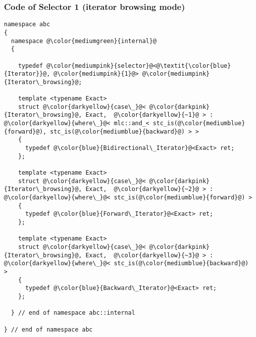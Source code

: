 \begin{frame}[fragile]
  \frametitle{Code of Selector 1 (iterator browsing mode)}

\begin{lstlisting}[escapechar=@,basicstyle={\tiny\sffamily}]
namespace abc
{
  namespace @\color{mediumgreen}{internal}@
  {

    typedef @\color{mediumpink}{selector}@<@\textit{\color{blue}{Iterator}}@, @\color{mediumpink}{1}@> @\color{mediumpink}{Iterator\_browsing}@;
  
    template <typename Exact>
    struct @\color{darkyellow}{case\_}@< @\color{darkpink}{Iterator\_browsing}@, Exact,  @\color{darkyellow}{~1}@ > : @\color{darkyellow}{where\_}@< mlc::and_< stc_is(@\color{mediumblue}{forward}@), stc_is(@\color{mediumblue}{backward}@) > >
    {
      typedef @\color{blue}{Bidirectional\_Iterator}@<Exact> ret;
    };
  
    template <typename Exact>
    struct @\color{darkyellow}{case\_}@< @\color{darkpink}{Iterator\_browsing}@, Exact,  @\color{darkyellow}{~2}@ > : @\color{darkyellow}{where\_}@< stc_is(@\color{mediumblue}{forward}@) >
    {
      typedef @\color{blue}{Forward\_Iterator}@<Exact> ret;
    };
  
    template <typename Exact>
    struct @\color{darkyellow}{case\_}@< @\color{darkpink}{Iterator\_browsing}@, Exact,  @\color{darkyellow}{~3}@ > : @\color{darkyellow}{where\_}@< stc_is(@\color{mediumblue}{backward}@) >
    {
      typedef @\color{blue}{Backward\_Iterator}@<Exact> ret;
    };
    
  } // end of namespace abc::internal

} // end of namespace abc
\end{lstlisting}

\end{frame}




